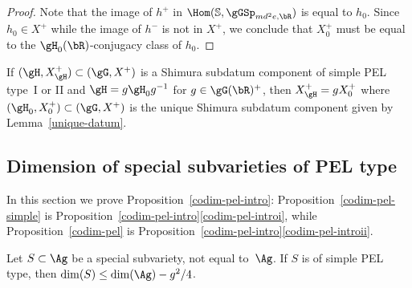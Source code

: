 \begin{proof}
Note that the image of $h^+$ in $\Hom(\mathbb{S},\gGSp_{md^2e,\bR})$ is equal to $h_0$.
Since $h_0 \in X^+$ while the image of $h^-$ is not in $X^+$, we conclude that $X_0^+$ must be equal to the $\gH_0(\bR)$-conjugacy class of $h_0$.
\end{proof}

\begin{corollary} \label{conj-class-datum}
If $(\gH, X_\gH^+) \subset (\gG, X^+)$ is a Shimura subdatum component of simple PEL type~I or II and $\gH = g\gH_0 g^{-1}$ for $g \in \gG(\bR)^+$, then $X_\gH^+ = gX_0^+$ where $(\gH_0, X_0^+) \subset (\gG, X^+)$ is the unique Shimura subdatum component given by Lemma~\ref{unique-datum}.
\end{corollary}

\subsection{Dimension of special subvarieties of PEL type}\label{sec:dims}

In this section we prove Proposition~\ref{codim-pel-intro}: Proposition~\ref{codim-pel-simple} is Proposition~\ref{codim-pel-intro}\eqref{codim-pel-introi}, while Proposition~\ref{codim-pel} is Proposition~\ref{codim-pel-intro}\eqref{codim-pel-introii}.

\begin{proposition}\label{codim-pel-simple}
Let $S \subset \Ag$ be a special subvariety, not equal to~$\Ag$.
If $S$ is of simple PEL type, then $\dim(S) \leq \dim(\Ag) - g^2/4$.
\end{proposition}

